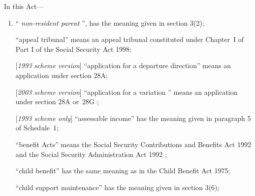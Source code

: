 \documentclass[12pt,a4paper]{article}
\begin{document}
In this Act—
\begin{enumerate}\item[]
    “%
\emph{non-resident parent}%
”, has the meaning given in section 3(2);


“appeal tribunal” means an appeal tribunal constituted under Chapter~I of Part I of the Social Security Act 1998;

[\emph{1993 scheme version}] “application for a departure direction” means an application under section 28A;

[\emph{2003 scheme version}] “application for a 
variation%
” means an application under section 28A
or~28G%
;

[\emph{1993 scheme only}]     “assessable income” has the meaning given in paragraph 5 of Schedule~1;

    “benefit Acts” means the 
Social Security Contributions and Benefits Act 1992 and the Social Security Administration Act 1992%
;



    “child benefit” has the same meaning as in the Child Benefit Act 1975;


    “child support maintenance” has the meaning given in section 3(6);


\end{enumerate}
\end{document}
